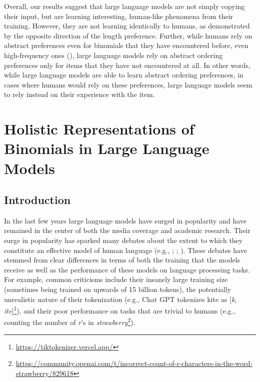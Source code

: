 \documentclass[
  12pt,
  letterpaper,
]{scrreprt}
\begin{document}
Overall, our results suggest that large language models are not simply
copying their input, but are learning interesting, human-like phenomena
from their training. However, they are not learning identically to
humans, as demonstrated by the opposite direction of the length
preference. Further, while humans rely on abstract preferences even for
binomials that they have encountered before, even high-frequency ones
(), large language models
rely on abstract ordering preferences only for items that they have not
encountered at all. In other words, while large language models are able
to learn abstract ordering preferences, in cases where humans would rely
on these preferences, large language models seem to rely instead on
their experience with the item.


\chapter{Holistic Representations of Binomials in Large Language
Models}\label{holistic-representations-of-binomials-in-large-language-models}

\section{Introduction}\label{introduction-4}

In the last few years large language models have surged in popularity
and have remained in the center of both the media coverage and academic
research. Their surge in popularity has sparked many debates about the
extent to which they constitute an effective model of human language
(e.g., ; ;
). These debates have stemmed from clear differences in terms of
both the training that the models receive as well as the performance of
these models on language processing tasks. For example, common
criticisms include their insanely large training size (sometimes being
trained on upwards of 15 billion tokens), the potentially unrealistic
nature of their tokenization (e.g., Chat GPT tokenizes kite as
{[}\emph{k}, \emph{ite}{]}\footnote{\url{https://tiktokenizer.vercel.app/}}),
and their poor performance on tasks that are trivial to humans (e.g.,
counting the number of \emph{r}'s in \emph{strawberry}\footnote{\url{https://community.openai.com/t/incorrect-count-of-r-characters-in-the-word-strawberry/829618}}).
\end{document}
